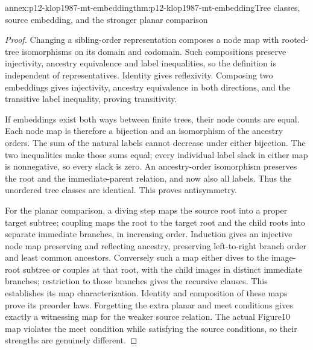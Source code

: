 \begin{annexitem}{annex:p12-klop1987-mt-embedding}{thm:p12-klop1987-mt-embedding}{Tree classes, source embedding, and the stronger planar comparison}
\begin{proof}
Changing a sibling-order representation composes a node map with
rooted-tree isomorphisms on its domain and codomain. Such compositions
preserve injectivity, ancestry equivalence and label inequalities, so
the definition is independent of representatives. Identity gives
reflexivity. Composing two embeddings gives injectivity, ancestry
equivalence in both directions, and the transitive label inequality,
proving transitivity.

If embeddings exist both ways between finite trees, their node counts
are equal. Each node map is therefore a bijection and an isomorphism
of the ancestry orders. The sum of the natural labels cannot decrease
under either bijection. The two inequalities make those sums equal;
every individual label slack in either map is nonnegative, so every
slack is zero. An ancestry-order isomorphism preserves the root and
the immediate-parent relation, and now also all labels. Thus the
unordered tree classes are identical. This proves antisymmetry.

For the planar comparison, a diving step maps the source root into
a proper target subtree; coupling maps the root to the target root
and the child roots into separate immediate branches, in increasing
order. Induction gives an injective node map preserving and reflecting
ancestry, preserving left-to-right branch order and least common
ancestors. Conversely such a map either dives to the image-root
subtree or couples at that root, with the child images in distinct
immediate branches; restriction to those branches gives the recursive
clauses. This establishes its map characterization. Identity and
composition of these maps prove its preorder laws. Forgetting the
extra planar and meet conditions gives exactly a witnessing map for
the weaker source relation. The actual Figure10 map violates the
meet condition while satisfying the source conditions, so their
strengths are genuinely different.
\end{proof}
\end{annexitem}

